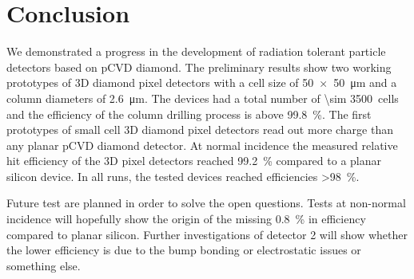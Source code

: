 \section{Conclusion}
We demonstrated a progress in the development of radiation tolerant particle detectors based on \ac{pCVD} diamond. The preliminary results show two working prototypes of 3D diamond pixel detectors with a cell size of \SI{50x50}{\um} and a column diameters of \SI{2.6}{\um}. The devices had a total number of \SI{\sim 3500}{cells} and the efficiency of the column drilling process is above \SI{99.8}{\%}. The first prototypes of small cell 3D diamond pixel detectors read out more charge than any planar \ac{pCVD} diamond detector. At normal incidence the measured relative hit efficiency of the 3D pixel detectors reached \SI{99.2}{\%} compared to a planar silicon device. In all runs, the tested devices reached efficiencies \SI{>98}{\%}.\par
Future test are planned in order to solve the open questions. Tests at non-normal incidence will hopefully show the origin of the missing \SI{.8}{\%} in efficiency compared to planar silicon. Further investigations of detector 2 will show whether the lower efficiency is due to the bump bonding or electrostatic issues or something else.